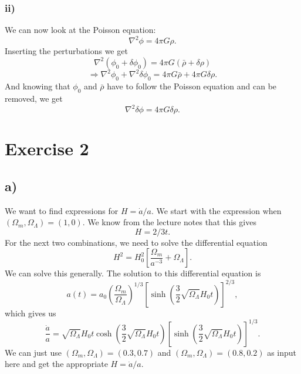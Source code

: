 \documentclass[a4paper,norsk, 10pt]{article}
\begin{document}
\subsubsection{ii)}
We can now look at the Poisson equation:
\begin{equation}
\nabla^2 \phi = 4\pi G\rho.
\end{equation}
Inserting the perturbations we get
\begin{equation}
\nabla^2 (\phi_0 + \delta \phi_0) = 4\pi G(\bar{\rho} + \delta \rho)
\end{equation}
\begin{equation}
\Rightarrow \nabla^2 \phi_0 + \nabla^2\delta \phi_0 = 4\pi G\bar{\rho} + 4\pi G\delta \rho.
\end{equation}
And knowing that $\phi_0$ and $\bar{\rho}$ have to follow the Poisson equation and can be removed, we get
\begin{equation}
\nabla^2 \delta\phi = 4\pi G \delta\rho.
\end{equation}



\section{Exercise 2}
\subsection{a)}
We want to find expressions for $H = \dot{a}/a$. We start with the expression when $(\Omega_{m},\Omega_{\Lambda}) = (1,0)$. We know from the lecture notes that this gives
\begin{equation}\label{eq:o_m=1}
H = 2/3t.
\end{equation}
For the next two combinations, we need to solve the differential equation
\begin{equation}\label{eq:H^2}
H^2 = H_0^2\left[\frac{\Omega_{m}}{a^{-3}} + \Omega_{\Lambda}\right].
\end{equation}
We can solve this generally. The solution to this differential equation is
\begin{equation}
a(t) = a_0\left(\frac{\Omega_{m}}{\Omega_{\Lambda}}\right)^{1/3}\left[\sinh\left(\frac{3}{2}\sqrt{\Omega_{\Lambda}}H_0 t\right)\right]^{2/3},
\end{equation} 
which gives us
\begin{equation}\label{o_m<1}
\frac{\dot{a}}{a} = \sqrt{\Omega_{\Lambda}}H_0 t\cosh\left(\frac{3}{2}\sqrt{\Omega_{\Lambda}}H_0 t\right)\left[\sinh\left(\frac{3}{2}\sqrt{\Omega_{\Lambda}}H_0 t\right)\right]^{1/3}.
\end{equation}
We can just use $(\Omega_{m},\Omega_{\Lambda}) = (0.3,0.7)$ and $(\Omega_{m},\Omega_{\Lambda}) = (0.8,0.2)$ as input here and get the appropriate $H = \dot{a}/a$.
\end{document}
